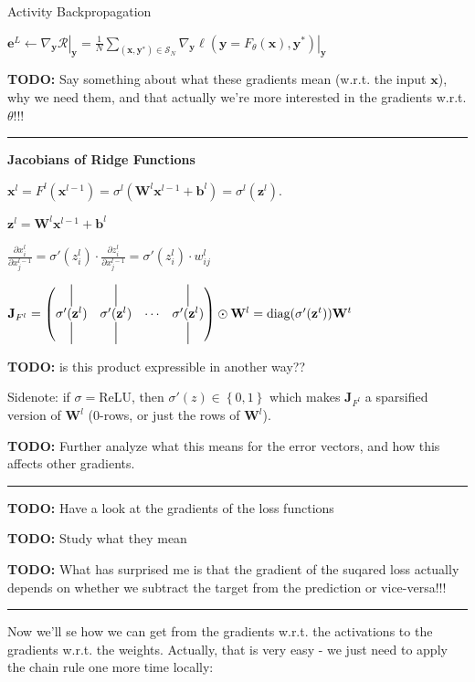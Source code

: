 \documentclass[a2paper,8pt]{extarticle}
\newcommand{\cR}{\mathcal{R}}
\newcommand{\cS}{\mathcal{S}}
\newcommand{\set}[1]{\left\{ #1 \right\}}
\newcommand*{\T}{\mathsf{T}}
\newcommand{\diag}{\text{diag}}
\newcommand{\mat}[1]{\mathbf{#1}}
\renewcommand{\vec}[1]{\mathbf{#1}}
\newcommand{\vb}{\vec{b}}
\newcommand{\ve}{\vec{e}}
\newcommand{\vx}{\vec{x}}
\newcommand{\vy}{\vec{y}}
\newcommand{\vz}{\vec{z}}
\newcommand{\MJ}{\mat{J}}
\newcommand{\MW}{\mat{W}}
\newcommand*{\vertbar}{\rule[-1ex]{0.5pt}{4ex}}
\newcommand{\evalat}[2]{\left. #1 \right|_{#2}}
\newcommand{\todo}[1]{\textbf{TODO:} #1}
\newcommand{\todo}[1]{%
}
\newcommand{\sep}{\vspace{0pt}\noindent\hrule\vspace{0pt}}
\newcommand{\sep}{\vspace{5pt}\noindent\hrule\vspace{5pt}}
\begin{document}
\begin{landscape}
\begin{multicols*}{7}
\begin{algorithm}[H]
\caption{Activity Backpropagation}
\DontPrintSemicolon
$
\ve^L
\gets
\evalat{\nabla_\vy\cR}{\vy}
=
\frac{1}{N}\sum_{(\vx,\vy^*)\in\cS_N}
\evalat{\nabla_\vy\ell(\vy=F_\theta(\vx),\vy^*)}{\vy}$\;
\For{$l\gets (L-1)$ (down) \KwTo $0$}{
$
\ve^l
\gets
\MJ_{F^{l+1}}^\T\ve_k^{l+1}
$
}
\end{algorithm}

\todo{Say something about what these gradients mean (w.r.t. the input $\vx$),
why we need them, and that actually we're more interested in the gradients
w.r.t. $\theta$!!!}

\sep

\textbf{Jacobians of Ridge Functions}

$
\vx^l=F^l(\vx^{l-1})=\sigma^l\left(\MW^l\vx^{l-1}+\vb^l\right)=\sigma^l(\vz^l).
$

$
\vz^l = \MW^l\vx^{l-1}+\vb^l
$

$
\frac{\partial x_i^l}{\partial x_j^{l-1}}
=\sigma'(z_i^l)
\cdot
\frac{\partial z_i^l}{\partial x_j^{l-1}}
=\sigma'(z_i^l)
\cdot
w_{ij}^l
$

$
\MJ_{F^l}
=
\begin{pmatrix}
\vertbar & \vertbar & & \vertbar\\
\sigma'(\vz^l) & \sigma'(\vz^l) & \cdots & \sigma'(\vz^l)\\
\vertbar & \vertbar & & \vertbar\\
\end{pmatrix}
\odot
\MW^l
=
\diag(\sigma'(\vz^t))\MW^t
$

\todo{is this product expressible in another way??}

Sidenote: if $\sigma=$ReLU, then $\sigma'(z)\in\set{0,1}$ which makes
$\MJ_{F^l}$ a sparsified version of $\MW^l$ (0-rows, or just the rows of
$\MW^l$).

\todo{Further analyze what this means for the error vectors, and how this
affects other gradients.}

\sep

\todo{Have a look at the gradients of the loss functions}

\todo{Study what they mean}

\todo{What has surprised me is that the gradient of the suqared loss actually
depends on whether we subtract the target from the prediction or vice-versa!!!}

\sep

Now we'll se how we can get from the gradients w.r.t. the activations to the
gradients w.r.t. the weights. Actually, that is very easy - we just need to
apply the chain rule one more time locally:


\end{multicols*}
\end{landscape}
\end{document}
